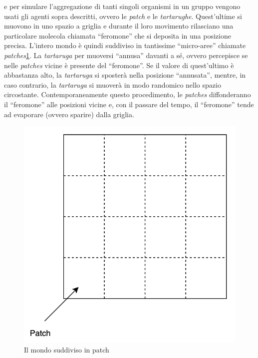 e per simulare l'aggregazione di tanti singoli organismi in un gruppo vengono usati gli agenti sopra descritti, 
ovvero le \textit{patch} e le \textit{tartarughe}.
Quest'ultime si muovono in uno spazio a griglia e durante il loro movimento rilasciano una particolare molecola
chiamata ``feromone'' che si deposita in una posizione precisa. L'intero mondo è quindi suddiviso
in tantissime ``micro-aree'' chiamate \textit{patches}\space\cref{fig:patch}. La \textit{tartaruga} per muoversi 
``annusa'' davanti a sé, ovvero percepisce se nelle \textit{patches} vicine è presente del ``feromone''. Se il valore di quest'ultimo è abbastanza alto, la 
\textit{tartaruga} si sposterà nella posizione ``annusata'', mentre, in caso contrario, la \textit{tartaruga} si muoverà in modo randomico nello spazio circostante. 
Contemporaneamente questo procedimento, le \textit{patches} diffonderanno il ``feromone'' alle posizioni vicine e, con il passare del tempo,
il ``feromone'' tende ad evaporare (ovvero sparire) dalla griglia.

\begin{figure}[ht]
    \centering
    \includegraphics[scale=0.6]{figures/patch.png}
    \caption{Il mondo suddiviso in patch}\label{fig:patch}
\end{figure}

